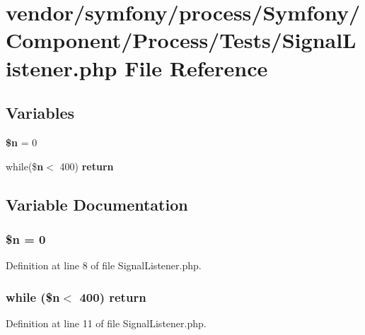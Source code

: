 \section{vendor/symfony/process/\+Symfony/\+Component/\+Process/\+Tests/\+Signal\+Listener.php File Reference}
\label{_signal_listener_8php}
\subsection*{Variables}
\begin{DoxyCompactItemize}
\item 
{\bf \$n} = 0
\item 
while(\${\bf n}$<$ 400) {\bf return}
\end{DoxyCompactItemize}


\subsection{Variable Documentation}
\subsubsection[{\$n}]{\setlength{\rightskip}{0pt plus 5cm}\${\bf n} = 0}\label{_signal_listener_8php_aa5fae90470d460a65d5211ec08e6b05c}


Definition at line 8 of file Signal\+Listener.\+php.

\subsubsection[{return}]{\setlength{\rightskip}{0pt plus 5cm}while (\${\bf n}$<$ 400) return}\label{_signal_listener_8php_a4f7ff1016d1f586dbcb7681a77aa534e}


Definition at line 11 of file Signal\+Listener.\+php.

